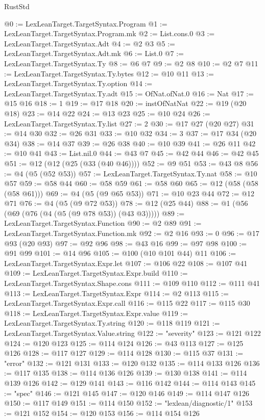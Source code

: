 \begin{lexlean}{RustStd}
\begin{coremodule}
@0 := LexLeanTarget.TargetSyntax.Program
@1 := LexLeanTarget.TargetSyntax.Program.mk
@2 := List.cons.{0}
@3 := LexLeanTarget.TargetSyntax.Adt
@4 := @2 @3
@5 := LexLeanTarget.TargetSyntax.Adt.mk
@6 := List.{0}
@7 := LexLeanTarget.TargetSyntax.Ty
@8 := @6 @7
@9 := @2 @8
@10 := @2 @7
@11 := LexLeanTarget.TargetSyntax.Ty.bytes
@12 := @10 @11
@13 := LexLeanTarget.TargetSyntax.Ty.option
@14 := LexLeanTarget.TargetSyntax.Ty.adt
@15 := OfNat.ofNat.{0}
@16 := Nat
@17 := @15 @16
@18 := 1
@19 := @17 @18
@20 := instOfNatNat
@22 := @19 (@20 @18)
@23 := @14 @22
@24 := @13 @23
@25 := @10 @24
@26 := LexLeanTarget.TargetSyntax.Ty.list
@27 := 2
@30 := @17 @27 (@20 @27)
@31 := @14 @30
@32 := @26 @31
@33 := @10 @32
@34 := 3
@37 := @17 @34 (@20 @34)
@38 := @14 @37
@39 := @26 @38
@40 := @10 @39
@41 := @26 @11
@42 := @10 @41
@43 := List.nil.{0}
@44 := @43 @7
@45 := @42 @44
@46 := @42 @45
@51 := @12 (@12 (@25 (@33 (@40 @46))))
@52 := @9 @51
@53 := @43 @8
@56 := @4 (@5 (@52 @53))
@57 := LexLeanTarget.TargetSyntax.Ty.nat
@58 := @10 @57
@59 := @58 @44
@60 := @58 @59
@61 := @58 @60
@65 := @12 (@58 (@58 (@58 @61)))
@69 := @4 (@5 (@9 @65 @53))
@71 := @10 @23 @44
@72 := @12 @71
@76 := @4 (@5 (@9 @72 @53))
@78 := @12 (@25 @44)
@88 := @1 (@56 (@69 (@76 (@4 (@5 (@9 @78 @53)) (@43 @3)))))
@89 := LexLeanTarget.TargetSyntax.Function
@90 := @2 @89
@91 := LexLeanTarget.TargetSyntax.Function.mk
@92 := @2 @16
@93 := 0
@96 := @17 @93 (@20 @93)
@97 := @92 @96
@98 := @43 @16
@99 := @97 @98
@100 := @91 @99
@101 := @14 @96
@105 := @100 (@10 @101 @44) @11
@106 := LexLeanTarget.TargetSyntax.Expr.let
@107 := @106 @22
@108 := @107 @41
@109 := LexLeanTarget.TargetSyntax.Expr.build
@110 := LexLeanTarget.TargetSyntax.Shape.cons
@111 := @109 @110
@112 := @111 @41
@113 := LexLeanTarget.TargetSyntax.Expr
@114 := @2 @113
@115 := LexLeanTarget.TargetSyntax.Expr.call
@116 := @115 @22
@117 := @115 @30
@118 := LexLeanTarget.TargetSyntax.Expr.value
@119 := LexLeanTarget.TargetSyntax.Ty.string
@120 := @118 @119
@121 := LexLeanTarget.TargetSyntax.Value.string
@122 := "severity"
@123 := @121 @122
@124 := @120 @123
@125 := @114 @124
@126 := @43 @113
@127 := @125 @126
@128 := @117 @127
@129 := @114 @128
@130 := @115 @37
@131 := "error"
@132 := @121 @131
@133 := @120 @132
@135 := @114 @133 @126
@136 := @117 @135
@138 := @114 @136 @126
@139 := @130 @138
@141 := @114 @139 @126
@142 := @129 @141
@143 := @116 @142
@144 := @114 @143
@145 := "spec"
@146 := @121 @145
@147 := @120 @146
@149 := @114 @147 @126
@150 := @117 @149
@151 := @114 @150
@152 := "lexlean/diagnostic/1"
@153 := @121 @152
@154 := @120 @153
@156 := @114 @154 @126

\end{coremodule}
\end{lexlean}
